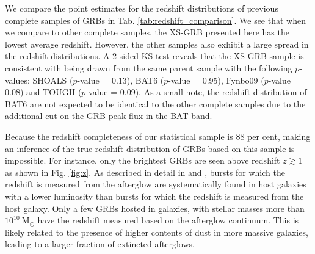 \documentclass[longauth]{aa}    %
\begin{document}
We compare the point estimates for the redshift distributions of previous
complete samples of GRBs in Tab. \ref{tab:redshift_comparison}. We see that when
we compare to other complete samples, the XS-GRB presented here has the lowest
average redshift. However, the other samples also exhibit a large spread in the
redshift distributions. A 2-sided KS test reveals that the XS-GRB sample is
consistent with being drawn from the same parent sample with the following
$p$-values: SHOALS ($p$-value = 0.13), BAT6 ($p$-value = 0.95), Fynbo09
($p$-value = 0.08) and TOUGH ($p$-value = 0.09). As a small note, the redshift
distribution of BAT6 are not expected to be identical to the other complete
samples due to the additional cut on the GRB peak flux in the BAT band.

Because the redshift completeness of our statistical sample is 88 per cent,
making an inference of the true redshift distribution of GRBs based on
this sample is impossible. %
For instance, only the brightest GRBs are seen above redshift $z \gtrsim 1$ as
shown in Fig. \ref{fig:z}. As described in detail in \citet{Hjorth2012} and
\citet{Perley2016b}, bursts for which the redshift is measured from the
afterglow are systematically found in host galaxies with a lower luminosity
than bursts for which the redshift is measured from the host galaxy. Only a few
GRBs hosted in galaxies, with stellar masses more than
$10^{10}~\mathrm{M}_\odot$ have the redshift measured based on the afterglow
continuum. This is likely related to the presence of higher contents of dust in
more massive galaxies, leading to a larger fraction of extincted afterglows.
\end{document}

